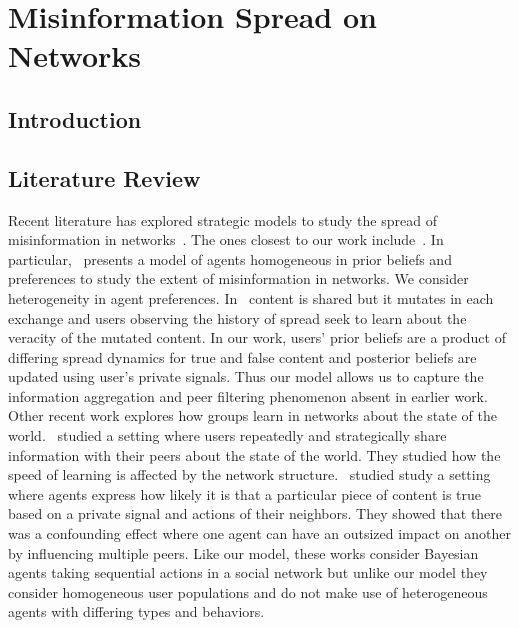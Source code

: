 \chapter{Misinformation Spread on Networks}\label{ch:misinfo}

\section{Introduction}

\section{Literature Review\label{sec:liter}} 
 Recent literature has explored strategic models to study the spread of misinformation in networks~\cite{sikder2020minimalistic, acemoglu2021model, jackson2022learning,mostagir2023social,bloch2018rumors, kranton2024social}. The ones closest to our work include~\cite{jackson2022learning, acemoglu2021model}. In particular,~\cite{acemoglu2021model} presents a model of agents homogeneous in prior beliefs and preferences to study the extent of misinformation in networks. We consider heterogeneity in agent preferences. In~\cite{jackson2022learning} content is shared but it mutates in each exchange and users observing the history of spread seek to learn about the veracity of the mutated content. In our work, users' prior beliefs are a product of differing spread dynamics for true and false content and posterior beliefs are updated using user's private signals. Thus our model allows us to capture the information aggregation and peer filtering phenomenon absent in earlier work.
Other recent work explores how groups learn in networks about the state of the world.~\cite{huang2024learning} studied a setting where users repeatedly and strategically share information with their peers about the state of the world. They studied how the speed of learning is affected by the network structure.~\cite{dasaratha2019aggregative} studied study a setting where agents express how likely it is that a particular piece of content is true based on a private signal and actions of their neighbors. They showed that there was a confounding effect where one agent can have an outsized impact on another by influencing multiple peers. Like our model, these works consider Bayesian agents taking sequential actions in a social network but unlike our model they consider homogeneous user populations and do not make use of heterogeneous agents with differing types and  behaviors.  

